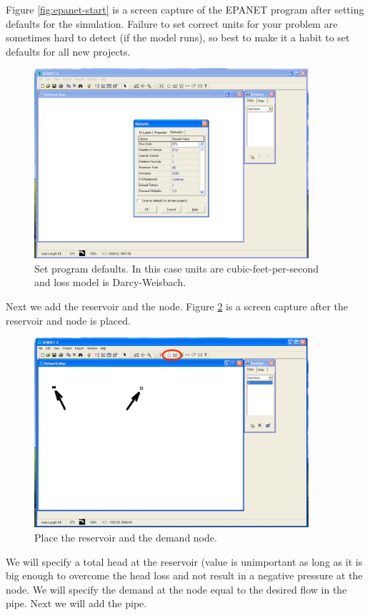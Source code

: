 Figure \ref{fig:epanet-start} is a screen capture of the EPANET program after setting defaults for the simulation.   Failure to set correct units for your problem are sometimes hard to detect (if the model runs), so best to make it a habit to set defaults for all new projects.
\begin{figure}[htbp] %
   \centering
   \includegraphics[width=4in]{set-default.pdf} 
   \caption{Set program defaults.  In this case units are cubic-feet-per-second and loss model is Darcy-Weisbach.}
   \label{fig:set-default}
\end{figure}
Next we add the reservoir and the node.   Figure \ref{fig:place-nodes} is a screen capture after the reservoir and node is placed.
\begin{figure}[htbp] %
   \centering
   \includegraphics[width=4in]{place-nodes.pdf} 
   \caption{Place the reservoir and the demand node.}
   \label{fig:place-nodes}
\end{figure}
We will specify a total head at the reservoir (value is unimportant as long as it is big enough to overcome the head loss and not result in a negative pressure at the node.   We will specify the demand at the node equal to the desired flow in the pipe.     Next we will add the pipe.

